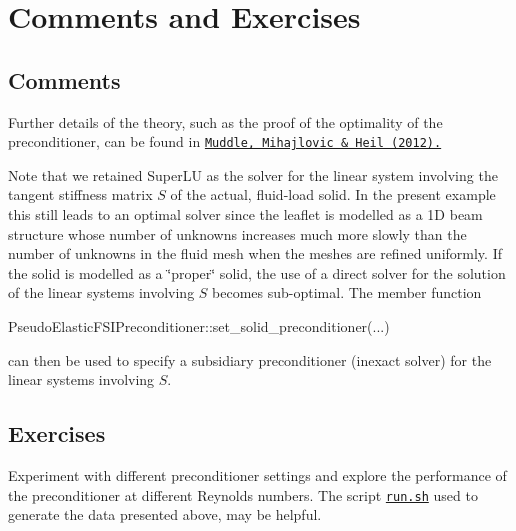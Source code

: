  

\hypertarget{index_comm_and_ex}{}\section{Comments and Exercises}\label{index_comm_and_ex}
\hypertarget{index_comm}{}\subsection{Comments}\label{index_comm}

\begin{DoxyItemize}
\item Further details of the theory, such as the proof of the optimality of the preconditioner, can be found in \href{http://dx.doi.org/10.1016/j.jcp.2012.07.001}{\tt Muddle, Mihajlovic \& Heil (2012).}~\newline
~\newline

\item Note that we retained Super\+LU as the solver for the linear system involving the tangent stiffness matrix $ S $ of the actual, fluid-\/load solid. In the present example this still leads to an optimal solver since the leaflet is modelled as a 1D beam structure whose number of unknowns increases much more slowly than the number of unknowns in the fluid mesh when the meshes are refined uniformly. If the solid is modelled as a \char`\"{}proper\char`\"{} solid, the use of a direct solver for the solution of the linear systems involving $ S $ becomes sub-\/optimal. The member function 
\begin{DoxyCode}
PseudoElasticFSIPreconditioner::set\_solid\_preconditioner(...)
\end{DoxyCode}
 can then be used to specify a subsidiary preconditioner (inexact solver) for the linear systems involving $ S $. ~\newline
~\newline

\end{DoxyItemize}\hypertarget{index_ex}{}\subsection{Exercises}\label{index_ex}

\begin{DoxyEnumerate}
\item Experiment with different preconditioner settings and explore the performance of the preconditioner at different Reynolds numbers. The script \href{../../../../demo_drivers/interaction/pseudo_solid_fsi_channel_with_leaflet/run.sh}{\tt {\ttfamily run.\+sh}} used to generate the data presented above, may be helpful.
\end{DoxyEnumerate}

